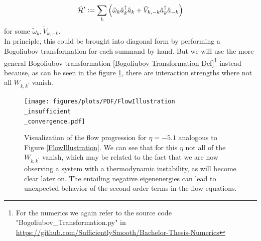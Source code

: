\begin{equation}
\hat{\mathcal{H}}^\prime \vcentcolon= \sum\limits_{k}\left(\tilde\omega_k \hat a^\dagger_k\hat a_k + \tilde V_{k,-k}\hat a^\dagger_k\hat a_{-k}\right)
\end{equation}
for some $\tilde\omega_k,\tilde V_{k,-k}$.\\
In principle, this could be brought into diagonal form by performing a Bogoliubov transformation for each summand by hand. But we will use the more general Bogoliubov transformation \ref{Bogoliubov Transformation Def}\footnote{For the numerics we again refer to the source code "Bogoliubov\_Transformation.py" in \url{https://github.com/SufficientlySmooth/Bachelor-Thesis-Numerics}} instead because, as can be seen in the figure \ref{FlowIllustrationInsufficient}, there are interaction strengths where not all $W_{k,k^\prime}$ vanish.
\begin{figure}[H]
    \centering
    \texttt{[image: figures/plots/PDF/FlowIllustration\\\_insufficient\\\_convergence.pdf]}
    \caption[Flow Visualization for $\eta=-5.1$]{Visualization of the flow progression for $\eta=-5.1$ analogous to Figure \ref{FlowIllustration}. We can see that for this $\eta$ not all of the $W_{k,k^\prime}$ vanish, which may be related to the fact that we are now observing a system with a thermodynamic instability, as will become clear later on. The entailing negative eigenenergies can lead to unexpected behavior of the second order terms in the flow equations.}
    \label{FlowIllustrationInsufficient}
\end{figure}

